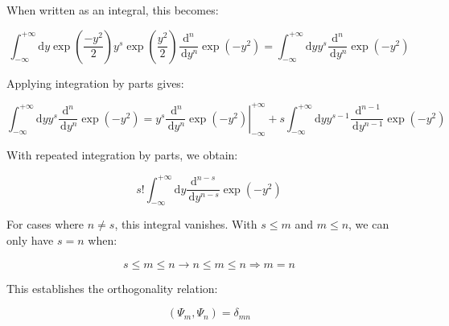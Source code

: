 When written as an integral, this becomes:

\begin{equation}
\int_{-\infty}^{+\infty} \mathrm{d} y \exp \left(\frac{-y^{2}}{2}\right) y^{s} \exp \left(\frac{y^{2}}{2}\right) \frac{\mathrm{d}^{n}}{\, \mathrm{d} y^{n}} \exp \left(-y^{2}\right)=\int_{-\infty}^{+\infty} \mathrm{d} y y^{s} \frac{\mathrm{d}^{n}}{\, \mathrm{d} y^{n}} \exp \left(-y^{2}\right)
\end{equation}

Applying integration by parts gives:

\begin{equation}
\int_{-\infty}^{+\infty} \mathrm{d} y y^{s} \frac{\mathrm{d}^{n}}{\, \mathrm{d} y^{n}} \exp \left(-y^{2}\right)=\left.y^{s} \frac{\, \mathrm{d}^{n}}{\, \mathrm{d} y^{n}} \exp \left(-y^{2}\right)\right|_{-\infty} ^{+\infty}+s \int_{-\infty}^{+\infty} \mathrm{d} y y^{s-1} \frac{\, \mathrm{d}^{n-1}}{\, \mathrm{d} y^{n-1}} \exp \left(-y^{2}\right)
\end{equation}

With repeated integration by parts, we obtain:

\begin{equation}
s!\int_{-\infty}^{+\infty} \mathrm{d} y \frac{\mathrm{d}^{n-s}}{\, \mathrm{d} y^{n-s}} \exp \left(-y^{2}\right)
\end{equation}

For cases where $n \neq s$, this integral vanishes. With $s \leq m$ and $m \leq n$, we can only have $s = n$ when:

\begin{equation}
s \leq m \leq n \rightarrow n \leq m \leq n \Longrightarrow m=n
\end{equation}

This establishes the orthogonality relation:

\begin{equation}
\left(\Psi_{m}, \Psi_{n}\right)=\delta_{m n}
\end{equation}
